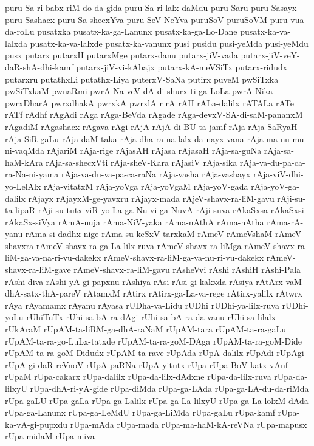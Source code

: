 {puru-Sa-ri-babx-riM-do-da-gida
puru-Sa-ri-lalx-daMdu
puru-Saru
puru-Sasayx
puru-Sashacx
puru-Sa-shecxYva
puru-SeV-NeYva
puruSoV
puruSoVM
puru-vua-da-roLu
pusatxka
pusatx-ka-ga-Lanunx
pusatx-ka-ga-Lo-Dane
pusatx-ka-va-lalxda
pusatx-ka-va-lalxde
pusatx-ka-vanunx
pusi
pusidu
pusi-yeMda
pusi-yeMdu
pusx
putarx
putarxH
putarxMge
putarx-danu
putarx-jiV-vada
putarx-jiV-veY-daR-shA-dhi-kamf
putarx-jiV-vi-kAbajx
putarx-kA-meVSiTx
putarx-ridudx
putarxru
putathxLi
putathx-Liya
puterxV-SaNa
putirx
puveM
pwSiTxka
pwSiTxkaM
pwnaRmi
pwrA-Na-veV-dA-di-shurx-ti-ga-LoLa
pwrA-Nika
pwrxDharA
pwrxdhakA
pwrxkA
pwrxlA
r
rA
rAH
rALa-dalilx
rATALa
rATe
rATf
rAdhf
rAgAdi
rAga
rAga-BeVda
rAgade
rAga-devxV-SA-di-saM-pananxM
rAgadiM
rAgashacx
rAgava
rAgi
rAjA
rAjA-di-BU-ta-jamf
rAja
rAja-SaRyaH
rAja-SiR-gaLu
rAja-daM-taka
rAja-dha-ra-na-lalx-da-nayx-vana
rAja-ma-nu-mu-ni-vaqMda
rAjariM
rAja-rige
rAjasAH
rAjasa
rAjasaH
rAja-sa-guNa
rAja-sa-haM-kAra
rAja-sa-shecxVti
rAja-sheV-Kara
rAjasiV
rAja-sika
rAja-va-du-pa-ca-ra-Na-ni-yama
rAja-va-du-va-pa-ca-raNa
rAja-vasha
rAja-vashayx
rAja-viV-dhi-yo-LelAlx
rAja-vitatxM
rAja-yoVga
rAja-yoVgaM
rAja-yoV-gada
rAja-yoV-ga-dalilx
rAjayx
rAjayxM-ge-yavxru
rAjayx-mada
rAjeV-shavx-ra-liM-gavu
rAji-su-ta-lipaR
rAji-su-tutx-viR-yo-La-ga-Nu-vi-ga-NuvA
rAji-suva
rAkaSxsa
rAkaSxsi
rAkaSx-siVya
rAmA-nuja
rAma-NiV-yaka
rAma-nAthA
rAma-nAtha
rAma-rA-yanu
rAma-si-dadhx-nige
rAma-su-keSxV-tarxkaM
rAmeV
rAmeVshaM
rAmeV-shavxra
rAmeV-shavx-ra-ga-La-lilx-ruva
rAmeV-shavx-ra-liMga
rAmeV-shavx-ra-liM-ga-va-na-ri-vu-dakekx
rAmeV-shavx-ra-liM-ga-va-nu-ri-vu-dakekx
rAmeV-shavx-ra-liM-gave
rAmeV-shavx-ra-liM-gavu
rAsheVvi
rAshi
rAshiH
rAshi-Pala
rAshi-diva
rAshi-yA-gi-papxnu
rAshiya
rAsi
rAsi-gi-kakxda
rAsiya
rAtArx-vaM-dhA-satx-thA-pareV
rAtamxM
rAtirx
rAtirx-ga-La-va-rege
rAtirx-yalilx
rAtwrx
rAya
rAyamamx
rAyanu
rAyasa
rUDha-va-Lidu
rUDhi
rUDhi-ya-lilx-ruva
rUDhi-yoLu
rUhiTuTx
rUhi-sa-bA-ra-dAgi
rUhi-sa-bA-ra-da-vanu
rUhi-sa-lilalx
rUkAraM
rUpAM-ta-liRM-ga-dhA-raNaM
rUpAM-tara
rUpAM-ta-ra-gaLu
rUpAM-ta-ra-go-LuLx-tatxde
rUpAM-ta-ra-goM-DAga
rUpAM-ta-ra-goM-Dide
rUpAM-ta-ra-goM-Didudx
rUpAM-ta-rave
rUpAda
rUpA-dalilx
rUpAdi
rUpAgi
rUpA-gi-daR-reVnoV
rUpA-paRNa
rUpA-yitutx
rUpa
rUpa-BoV-katx-vAnf
rUpaM
rUpa-cakarx
rUpa-dalilx
rUpa-da-lilx-dAdxne
rUpa-da-lilx-ruva
rUpa-da-lilxyU
rUpa-dhA-ri-yA-gide
rUpa-diMda
rUpa-ga-LAda
rUpa-ga-LA-du-da-riMda
rUpa-gaLU
rUpa-gaLa
rUpa-ga-Lalilx
rUpa-ga-La-lilxyU
rUpa-ga-La-lolxM-dAda
rUpa-ga-Lanunx
rUpa-ga-LeMdU
rUpa-ga-LiMda
rUpa-gaLu
rUpa-kamf
rUpa-ka-vA-gi-pupxdu
rUpa-mAda
rUpa-mada
rUpa-ma-haM-kA-reVNa
rUpa-mapusx
rUpa-midaM
rUpa-miva
}
